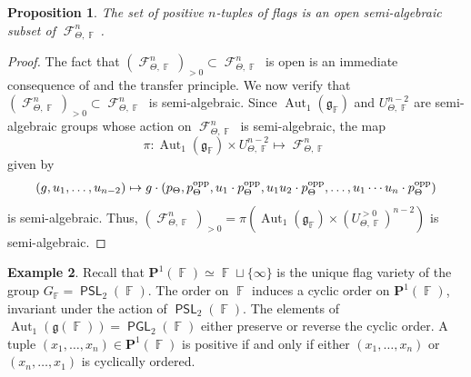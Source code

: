 \documentclass{amsart}
\theoremstyle{plain}
\newtheorem{proposition}{Proposition}[section]
\theoremstyle{definition}
\newtheorem{example}[proposition]{Example}
\DeclareMathOperator{\Aut}{Aut}
\DeclareMathOperator{\PSL}{\mathsf{PSL}}
\DeclareMathOperator{\PGL}{\mathsf{PGL}}
\DeclareMathOperator{\Fc}{\mathcal{F}}
\DeclareMathOperator{\Fb}{{\mathbb{F}}}
\newcommand{\opp}{\textnormal{opp}}
\newcommand{\1}{\mathbf{1}}
\begin{document}
\begin{proposition}
\label{propo: positive n-tuples is semi-algebraic}
    The set of positive $n$-tuples of flags is an open semi-algebraic subset of $\Fc_{\Theta,\Fb}^n$.
\end{proposition}
\begin{proof}
    The fact that $(\Fc_{\Theta,\Fb}^n)_{>0}\subset\Fc_{\Theta,\Fb}^n$ is open is an immediate consequence of \cite[Proposition 13.27]{guichard2025generalizing} and the transfer principle. We now verify that\break $(\Fc_{\Theta,\Fb}^n)_{>0}\subset\Fc_{\Theta,\Fb}^n$ is semi-algebraic. Since $\Aut_1(\mathfrak g_{\Fb})$ and $ U_{\Theta,\Fb}^{n-2}$ are semi-algebraic groups whose action on $\Fc_{\Theta,\Fb}^n$ is semi-algebraic, the map 
    \[\pi \colon  \Aut_1(\mathfrak g_{\Fb}) \times U_{\Theta,\Fb}^{n-2}  \mapsto  \Fc_{\Theta,\Fb}^n\]
    given by
    \[(g,u_1,\ldots, u_{n-2}) \mapsto g\cdot (p_\Theta, p_\Theta^\opp, u_1 \cdot p_\Theta^\opp, u_1 u_2 \cdot p_\Theta^\opp, \ldots, u_1 \cdots u_n \cdot p_\Theta^\opp)
    \]
    is semi-algebraic. Thus, $(\Fc_{\Theta,\Fb}^n)_{>0} = \pi( \Aut_1(\mathfrak{g}_{\Fb}) \times (U_{\Theta,\Fb}^{>0})^{n-2})$ is semi-algebraic.
\end{proof}

\begin{example}
    Recall that $\mathbf{P}^1(\Fb) \simeq \Fb \sqcup \{\infty\}$ is the unique flag variety of the group $G_{\Fb} = \PSL_2(\Fb)$. The order on $\Fb$ induces a cyclic order on $\mathbf{P}^1(\Fb)$, invariant under the action of $\PSL_2(\Fb)$. The elements of $\Aut_1(\mathfrak{g}(\Fb)) = \PGL_2(\Fb)$ either preserve or reverse the cyclic order. A tuple $(x_1,\ldots, x_n) \in \mathbf{P}^1(\Fb)$ is positive if and only if either $(x_1,\ldots, x_n)$ or $(x_n, \ldots, x_1)$ is cyclically ordered.
\end{example}
\end{document}
